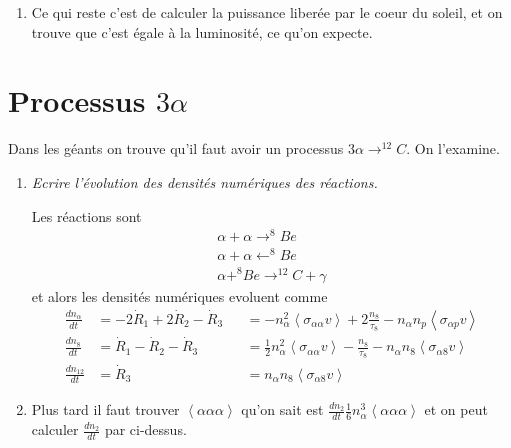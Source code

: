 \documentclass[10pt]{report}
\newcommand{\rd}[2]{\frac{d#1}{d#2}}
\newcommand{\expvalue}[1]{\left<#1\right>}
\begin{document}
\begin{enumerate}[1.]
        Mais aussi, on voit que $\rd{n_D}{t} = 0$ nous donne $\frac{n_D}{n_p} = \frac{1}{2} \frac{\expvalue{\sigma_{pp}v}}{\expvalue{\sigma_{pD}v}} \sim 10^{-18}$ \`a l'\'equilibre. On voit similairement que $\frac{n_3}{n_p} = \sqrt{\frac{1}{2}\frac{\expvalue{\sigma_{pp}v}}{\expvalue{\sigma_{33} v}}}$. Alors on trouve
        \begin{align}
            \rd{n_p}{t} &= -\expvalue{\sigma_{pp}v}n_p^2
        \end{align}
        et l'\'echelle de temps caracteristique est $\frac{1}{n_p\expvalue{\sigma_{pp}v}}$. 

    \item Ce qui reste c'est de calculer la puissance liber\'ee par le coeur du soleil, et on trouve que c'est \'egale \`a la luminosit\'e, ce qu'on expecte.
\end{enumerate}

\section{Processus $3\alpha$}

Dans les g\'eants on trouve qu'il faut avoir un processus $3\alpha \to ^{12}C$. On l'examine.

\begin{enumerate}[1.]
    \item \emph{Ecrire l'\'evolution des densit\'es num\'eriques des  r\'eactions.}

        Les r\'eactions sont
        \begin{align}
            \alpha + \alpha \rightarrow ^8Be\\
            \alpha + \alpha \leftarrow ^8Be\\
            \alpha + ^8Be \to ^{12} C + \gamma
        \end{align}
        et alors les densit\'es num\'eriques evoluent comme
        \begin{align}
            \rd{n_\alpha}{t} &= -2\dot{R}_1 + 2\dot{R}_2 - \dot{R}_3 &&= -n_\alpha^2\expvalue{\sigma_{\alpha\alpha}v} + 2\frac{n_8}{\tau_8} - n_\alpha n_p \expvalue{\sigma_{\alpha p}v}\\
            \rd{n_8}{t} &=\dot{R}_1 - \dot{R}_2 - \dot{R}_3 &&= \frac{1}{2}n_\alpha^2 \expvalue{\sigma_{\alpha\alpha}v} - \frac{n_8}{\tau_8} - n_\alpha n_8\expvalue{\sigma_{\alpha 8}v}\\
            \rd{n_12}{t} &= \dot{R}_3 &&= n_\alpha n_8 \expvalue{\sigma_{\alpha 8} v}
        \end{align}

    \item Plus tard il faut trouver $\expvalue{\alpha \alpha \alpha}$ qu'on sait est $\rd{n_2}{t}\frac{1}{6}n_\alpha^3\expvalue{\alpha \alpha \alpha}$ et on peut calculer $\rd{n_2}{t}$ par ci-dessus.

\end{enumerate}
\end{document}

